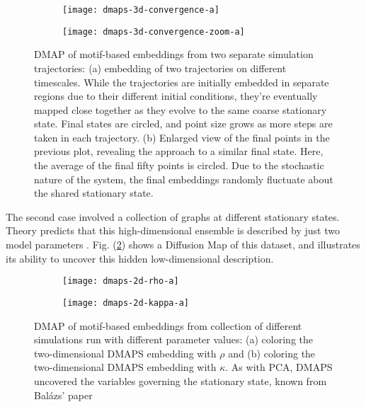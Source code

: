 \documentclass[12pt]{article}
\begin{document}
\begin{spacing}{2}
\begin{figure}[h!]
  \vspace{-5mm}
  \centering
  \begin{subfigure}{0.49\textwidth}
    \centering
    \texttt{[image: dmaps-3d-convergence-a]}
    \subcaption{\label{fig:dmaps-results-regular}}
  \end{subfigure} %
  \begin{subfigure}{0.49\textwidth}
    \centering
    \texttt{[image: dmaps-3d-convergence-zoom-a]}
    \subcaption{\label{fig:dmaps-results-zoom}}
  \end{subfigure}%
  \caption{DMAP of motif-based embeddings from two separate simulation
    trajectories: (a) embedding of two trajectories on different
    timescales. While the trajectories are initially embedded in
    separate regions due to their different initial conditions,
    they're eventually mapped close together as they evolve to the
    same coarse stationary state. Final states are circled, and point
    size grows as more steps are taken in each trajectory. (b)
    Enlarged view of the final points in the previous plot, revealing
    the approach to a similar final state. Here, the average of the
    final fifty points is circled. Due to the stochastic nature of
    the system, the final embeddings randomly fluctuate about the
    shared stationary state. \label{fig:dmaps-results}}
\end{figure}

\noindent The second case involved a collection of graphs at different
stationary states. Theory predicts that this high-dimensional ensemble
is described by just two model
parameters \cite{rath_multigraph_2012, rath_time_2012}. Fig. (\ref{fig:dmaps-ensemble}) shows a Diffusion Map of
this dataset, and illustrates its ability to uncover this hidden
low-dimensional description. \\

\begin{figure}[h!]
  \vspace{-5mm}
  \centering
  \begin{subfigure}{0.49\textwidth}
    \centering
    \texttt{[image: dmaps-2d-rho-a]}
    \subcaption{\label{fig:dmaps-rho}}
  \end{subfigure} %
  \begin{subfigure}{0.49\textwidth}
    \centering
    \texttt{[image: dmaps-2d-kappa-a]}
    \subcaption{\label{fig:dmaps-kappa}}
  \end{subfigure}%
  \caption{DMAP of motif-based embeddings from collection of different
    simulations run with different parameter values: (a) coloring the
    two-dimensional DMAPS embedding with $\rho$ and (b) coloring the
    two-dimensional DMAPS embedding with $\kappa$. As with PCA, DMAPS
    uncovered the variables governing the stationary state, known from
    Bal\'{a}zs' paper \label{fig:dmaps-ensemble}}
\end{figure}



\end{spacing}
\end{document}
